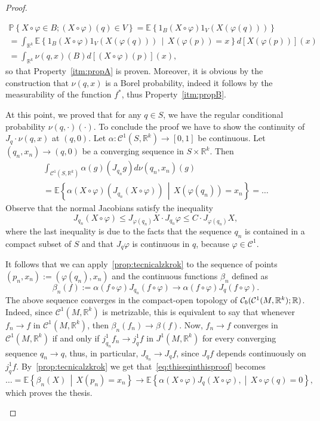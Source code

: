 \documentclass[10pt]{amsart}
\theoremstyle{definition}\newtheorem{defi}[theo]{Definition}\newtheorem{rema}[theo]{Remark}\newtheorem{exam}[theo]{Example}\newtheorem{exem}[theo]{Example}\newtheorem{nota}[theo]{Notation}
\newcommand{\R}{\mathbb{R}}
\newcommand{\PP}{\mathbb{P}}
\newcommand{\EE}{\mathbb{E}}
\newcommand{\mC}{\mathcal{C}}
\newcommand{\f}{\varphi}
\renewcommand{\a}{\alpha}
\begin{document}
\begin{proof}
\begin{enumerate}
\begin{multline}
\PP\left\{X\circ\f\in B; (X\circ\f)(q)\in V\right\} =
\EE\left\{1_B(X\circ \f) 1_V(X(\f(q)))\right\}
\\
=
\int_{\R^k}
\EE\left\{ 1_B(X\circ \f) 1_V(X(\f(q)))\,\middle|\,X(\f(p))=x\right\} d[X(\f(p))](x)
\\
=
\int_{\R^k}
\nu(q,x)(B)d[(X\circ\f)(p)](x),
\end{multline}
so that Property~\eqref{itm:propA} is proven. Moreover, it is obvious by the construction that $\nu(q,x)$ is a Borel probability, indeed it follows by the measurability of the function $f^*$, thus Property~\eqref{itm:propB}.

At this point, we proved that for any $q\in S$, we have the regular conditional probability $\nu(q,\cdot)(\cdot)$. To conclude the proof we have to show the continuity of ${J_q\cdot\nu(q,x)}$ at $(q,0)$. Let $\a\colon \mC^1(S,\R^k)\to [0,1]$ be continuous. Let $(q_n,x_n)\to (q,0)$ be a converging sequence in $S\times \R^k$. Then
\begin{multline}\label{eq:thiseqinthisproof}
\int_{\mC^1(S,\R^k)}\a (g)(J_{q_n} g) d\nu(q_n,x_n)(g)\\
=\EE\left\{ \a(X\circ \f)\left( J_{q_n}(X\circ\f)\right)\,\middle|\,X(\f(q_n))=x_n\right\}
=\dots
\end{multline}
Observe that the normal Jacobians satisfy the inequality
\begin{equation*}
J_{q_n}(X\circ\f)\le J_{\f(q_n)}X\cdot J_{q_n}\f\le C\cdot J_{\f(q_n)}X,
\end{equation*}
where the last inequality is due to the facts that the sequence ${q_n}$ is contained in a compact subset of $S$ and that $J_q\f$ is continuous in $q$, because $\f\in\mC^1$.

It follows that we can apply~\cref{prop:tecnicalzkrok} to the sequence of points $(p_n,x_n):=(\f(q_n),x_n)$ and the continuous functions $\beta_n$ defined as
\begin{equation*}
\beta_n(f):=\a\left( f\circ\f\right) J_{q_n}(f\circ\f)\to \a(f\circ\f)J_q(f\circ \f).
\end{equation*}
The above sequence converges in the compact-open topology of $\mC_b(\mC^1(M,\R^k);\linebreak \R)$. Indeed, since $\mC^1(M,\R^k)$ is metrizable, this is equivalent to say that whenever $f_n\to f$ in $\mC^1(M,\R^k)$, then $\beta_n(f_n)\to\beta(f)$. Now, $f_n\to f$ converges in $\mC^1(M,\R^k)$ if and only if $j^1_{q_n}f_n\to j^1_qf$ in $J^1(M,\R^k)$ for every converging sequence $q_n\to q$, thus, in particular, $J_{q_n}\to J_qf$, since $J_qf$ depends continuously on $j^1_qf$. By~\cref{prop:tecnicalzkrok} we get that~\eqref{eq:thiseqinthisproof} becomes
\begin{equation*}
\dots =\EE\left\{\beta_n(X)\,\middle|\,X(p_n)=x_n\right\}\to \EE\left\{\a(X\circ \f)J_q(X\circ\f),\middle|\,X\circ\f(q)=0\right\},
\end{equation*}
which proves the thesis.\qedhere
\end{enumerate}\let\qed\relax
\end{proof}
\end{document}
